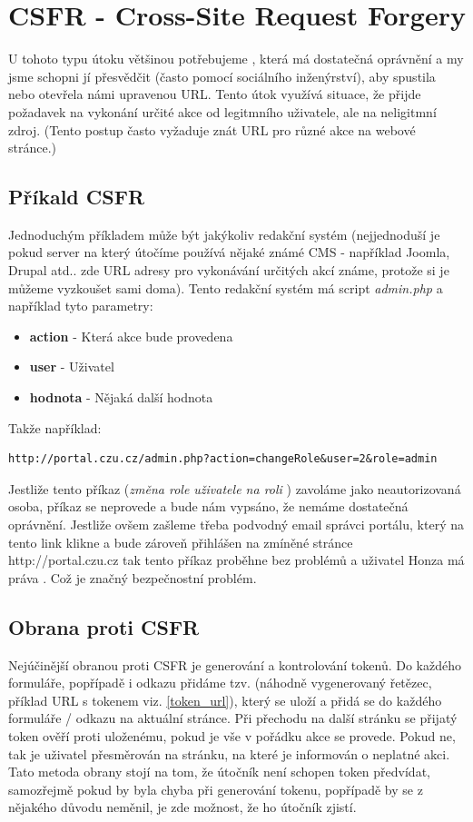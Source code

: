 \documentclass[12pt, a4paper]{report}
\begin{document}
\section{CSFR - Cross-Site Request Forgery}
U tohoto typu útoku většinou potřebujeme , která má dostatečná oprávnění a my jsme schopni jí přesvědčit (často pomocí sociálního inženýrství), aby spustila nebo otevřela námi upravenou URL. Tento útok využívá situace, že přijde požadavek na vykonání určité akce od legitmního uživatele, ale na neligitmní zdroj. (Tento postup často vyžaduje znát URL pro různé akce na webové stránce.)
\subsection{Příkald CSFR}
Jednoduchým příkladem může být jakýkoliv redakční systém (nejjednoduší je pokud server na který útočíme používá nějaké známé CMS - například Joomla, Drupal atd.. zde URL adresy pro vykonávání určitých akcí známe, protože si je můžeme vyzkoušet sami doma). Tento redakční systém má script \textit{admin.php} a například tyto parametry:
\begin{itemize}
\item \textbf{action} - Která akce bude provedena
\item \textbf{user} - Uživatel
\item \textbf{hodnota} - Nějaká další hodnota
\end{itemize}

Takže například:
\begin{lstlisting}[label=csfr_example1,caption=URL změny uživatelské role]
http://portal.czu.cz/admin.php?action=changeRole&user=2&role=admin
\end{lstlisting}

Jestliže tento příkaz (\textit{změna role uživatele  na roli }) zavoláme jako neautorizovaná osoba, příkaz se neprovede a bude nám vypsáno, že nemáme dostatečná oprávnění. Jestliže ovšem zašleme třeba podvodný email správci portálu, který na tento link klikne a bude zároveň přihlášen na zmíněné stránce {http://portal.czu.cz} tak tento příkaz proběhne bez problémů a uživatel Honza má práva . Což je značný bezpečnostní problém.

\subsection{Obrana proti CSFR}
Nejúčinější obranou proti CSFR je generování a kontrolování tokenů. Do každého formuláře, popřípadě i odkazu přidáme tzv.  (náhodně vygenerovaný řetězec, příklad URL s tokenem viz. \ref{token_url}), který se uloží a přidá se do každého formuláře / odkazu na aktuální stránce. Při přechodu na další stránku se přijatý token ověří proti uloženému, pokud je vše v pořádku akce se provede. Pokud ne, tak je uživatel přesměrován na  stránku, na které je informován o neplatné akci. Tato metoda obrany stojí na tom, že útočník není schopen token předvídat, samozřejmě pokud by byla chyba při generování tokenu, popřípadě by se z nějakého důvodu neměnil, je zde možnost, že ho útočník zjistí.
\end{document}
